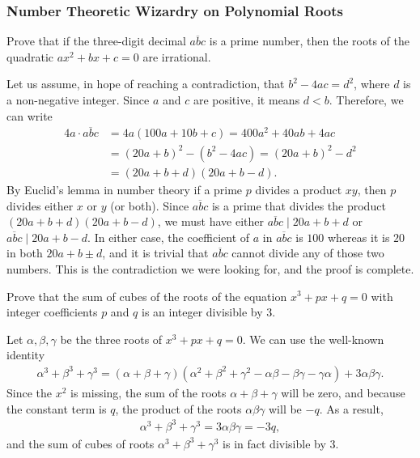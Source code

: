 \documentclass[12pt,a4paper]{memoir}
\theoremstyle{definition}
\begin{document}
\subsubsection{Number Theoretic Wizardry on Polynomial Roots}

\begin{question}
	Prove that if the three-digit decimal $\overline{abc}$ is a prime number, then the roots of the quadratic $ax^2+bx+c=0$ are irrational.
\end{question}

\begin{solution}
	Let us assume, in hope of reaching a contradiction, that $b^2-4ac=d^2$, where $d$ is a non-negative integer. Since $a$ and $c$ are positive, it means $d<b$. Therefore, we can write
	\begin{align*}
		4a \cdot \overline{abc} &= 4a(100a+10b+c)=400a^2+40ab+4ac\\
		&= (20a+b)^2 - (b^2-4ac) = (20a+b)^2 - d^2\\
		&= (20a+b+d)(20a+b-d).
	\end{align*}
	By Euclid's lemma in number theory if a prime $p$ divides a product $xy$, then $p$ divides either $x$ or $y$ (or both). Since $\overline{abc}$ is a prime that divides the product $(20a+b+d)(20a+b-d)$, we must have either $\overline{abc} \mid 20a+b+d$ or $\overline{abc} \mid 20a+b-d$. In either case, the coefficient of $a$ in $\overline{abc}$ is $100$ whereas it is $20$ in both $20a+b\pm d$, and it is trivial that $\overline{abc}$ cannot divide any of those two numbers. This is the contradiction we were looking for, and the proof is complete.
\end{solution}

\begin{question}
	Prove that the sum of cubes of the roots of the equation $x^3+px+q=0$ with integer coefficients $p$ and $q$ is an integer divisible by $3$.
\end{question}

\begin{solution}
	Let $\alpha,\beta,\gamma$ be the three roots of $x^3+px+q=0$. We can use the well-known identity
	\begin{align*}
		\alpha^3+\beta^3+\gamma^3 = (\alpha+\beta+\gamma)(\alpha^2+\beta^2+\gamma^2-\alpha\beta-\beta\gamma-\gamma\alpha)+3\alpha\beta\gamma.
	\end{align*}
	Since the $x^2$ is missing, the sum of the roots $\alpha+\beta+\gamma$ will be zero, and because the constant term is $q$, the product of the roots $\alpha\beta\gamma$ will be $-q$. As a result,
	\begin{align*}
		\alpha^3+\beta^3+\gamma^3 = 3\alpha\beta\gamma=-3q,
	\end{align*}
	and the sum of cubes of roots $\alpha^3+\beta^3+\gamma^3$ is in fact divisible by $3$.
\end{solution}
\end{document}
